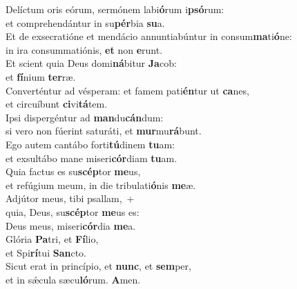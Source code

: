 \oddverse Delíctum oris eórum, sermónem labi\textbf{ó}rum i\textbf{psó}rum:~\*\\
\oddverse et comprehendántur in su\textbf{pér}bia \textbf{su}a.\\
\evenverse Et de exsecratióne et mendácio annuntiabúntur in consum\textbf{ma}ti\textbf{ó}ne:~\*\\
\evenverse in ira consummatiónis, \textbf{et} non \textbf{e}runt.\\
\oddverse Et scient quia Deus domi\textbf{ná}bitur \textbf{Ja}cob:~\*\\
\oddverse et \textbf{fí}nium \textbf{ter}ræ.\\
\evenverse Converténtur ad vésperam: et famem pati\textbf{én}tur ut \textbf{ca}nes,~\*\\
\evenverse et circuíbunt \textbf{ci}vi\textbf{tá}tem.\\
\oddverse Ipsi dispergéntur ad \textbf{man}du\textbf{cán}dum:~\*\\
\oddverse si vero non fúerint saturáti, et \textbf{mur}mu\textbf{rá}bunt.\\
\evenverse Ego autem cantábo forti\textbf{tú}dinem \textbf{tu}am:~\*\\
\evenverse et exsultábo mane miseri\textbf{cór}diam \textbf{tu}am.\\
\oddverse Quia factus es su\textbf{scép}tor \textbf{me}us,~\*\\
\oddverse et refúgium meum, in die tribulati\textbf{ó}nis \textbf{me}æ.\\
\evenverse Adjútor meus, tibi psallam,~+\\
\evenverse  quia, Deus, su\textbf{scép}tor \textbf{me}us es:~\*\\
\evenverse Deus meus, miseri\textbf{cór}dia \textbf{me}a.\\
\oddverse Glória \textbf{Pa}tri, et \textbf{Fí}lio,~\*\\
\oddverse et Spi\textbf{rí}tui \textbf{San}cto.\\
\evenverse Sicut erat in princípio, et \textbf{nunc}, et \textbf{sem}per,~\*\\
\evenverse et in sǽcula sæcu\textbf{ló}rum. \textbf{A}men.\\
